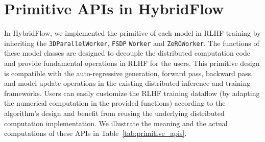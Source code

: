 \section{Primitive APIs in HybridFlow} \label{appendix:primitive_apis}
In HybridFlow, we implemented the primitive of each model in RLHF training by inheriting the \texttt{3DParallelWorker}, \texttt{FSDP} \texttt{Worker} and \texttt{ZeROWorker}. The functions of these model classes are designed to decouple the distributed computation code and provide fundamental operations in RLHF for the users. This primitive design is compatible with the auto-regressive generation, forward pass, backward pass, and model update operations in the existing distributed inference and training frameworks. Users can easily customize the RLHF training dataflow (by adapting the numerical computation in the provided functions) according to the algorithm's design and benefit from reusing the underlying distributed computation implementation. We illustrate the meaning and the actual computations of these APIs in Table~\ref{tab:primitive_apis}. 






